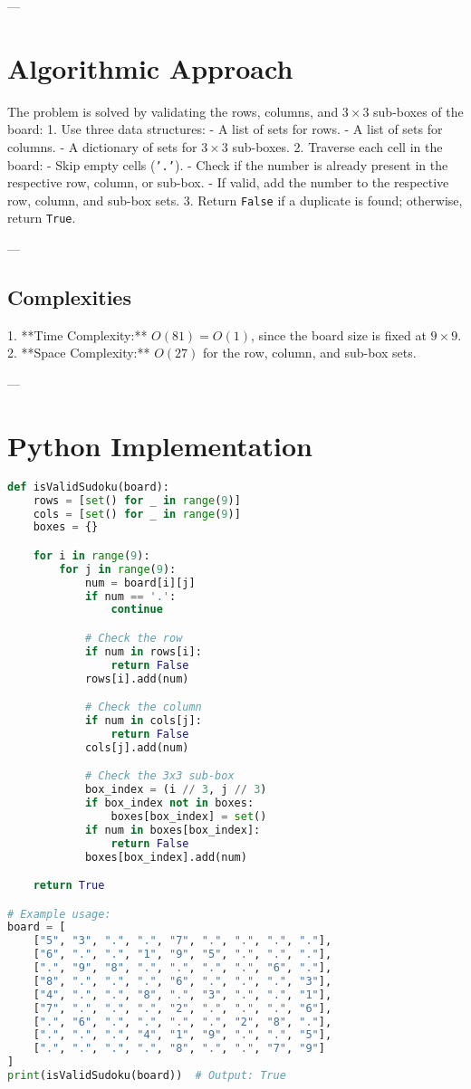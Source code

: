 ---

\section*{Algorithmic Approach}
The problem is solved by validating the rows, columns, and \(3 \times 3\) sub-boxes of the board:
1. Use three data structures:
   - A list of sets for rows.
   - A list of sets for columns.
   - A dictionary of sets for \(3 \times 3\) sub-boxes.
2. Traverse each cell in the board:
   - Skip empty cells (\texttt{'.'}).
   - Check if the number is already present in the respective row, column, or sub-box.
   - If valid, add the number to the respective row, column, and sub-box sets.
3. Return \texttt{False} if a duplicate is found; otherwise, return \texttt{True}.

---

\subsection*{Complexities}
1. **Time Complexity:** \(O(81) = O(1)\), since the board size is fixed at \(9 \times 9\).
2. **Space Complexity:** \(O(27)\) for the row, column, and sub-box sets.

---

\section*{Python Implementation}
\begin{fullwidth}
\begin{lstlisting}[language=Python]
def isValidSudoku(board):
    rows = [set() for _ in range(9)]
    cols = [set() for _ in range(9)]
    boxes = {}

    for i in range(9):
        for j in range(9):
            num = board[i][j]
            if num == '.':
                continue

            # Check the row
            if num in rows[i]:
                return False
            rows[i].add(num)

            # Check the column
            if num in cols[j]:
                return False
            cols[j].add(num)

            # Check the 3x3 sub-box
            box_index = (i // 3, j // 3)
            if box_index not in boxes:
                boxes[box_index] = set()
            if num in boxes[box_index]:
                return False
            boxes[box_index].add(num)

    return True

# Example usage:
board = [
    ["5", "3", ".", ".", "7", ".", ".", ".", "."],
    ["6", ".", ".", "1", "9", "5", ".", ".", "."],
    [".", "9", "8", ".", ".", ".", ".", "6", "."],
    ["8", ".", ".", ".", "6", ".", ".", ".", "3"],
    ["4", ".", ".", "8", ".", "3", ".", ".", "1"],
    ["7", ".", ".", ".", "2", ".", ".", ".", "6"],
    [".", "6", ".", ".", ".", ".", "2", "8", "."],
    [".", ".", ".", "4", "1", "9", ".", ".", "5"],
    [".", ".", ".", ".", "8", ".", ".", "7", "9"]
]
print(isValidSudoku(board))  # Output: True
\end{lstlisting}
\end{fullwidth}


